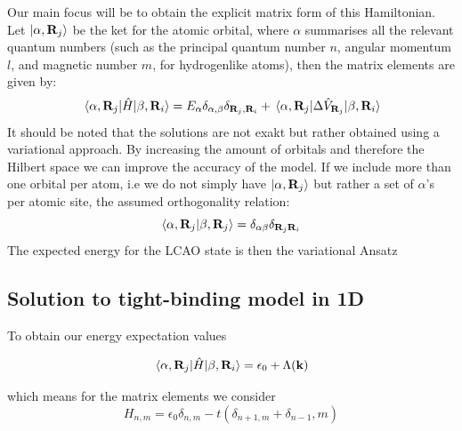 \documentclass[11pt, a4paper]{article}
\theoremstyle{definition} %
\begin{document}
Our main focus will be to obtain the explicit matrix form of this Hamiltonian. Let $\ket{\alpha, \mathbf{R}_j}$ be the ket for the atomic orbital, where $\alpha$ summarises all the relevant quantum numbers (such as the principal quantum number $n$, angular momentum $l$, and magnetic number $m$, for hydrogenlike atoms), then the matrix elements are given by:
\begin{equation}
	\mel{\alpha, \mathbf{R}_j}{\hat{H}}{\beta, \mathbf{R}_i} = E_{\alpha} \delta_{\alpha,\beta} \delta_{\mathbf{R}_j, \mathbf{R}_i} + \mel{\alpha,\mathbf{R}_j}{\Delta \hat{V}_{\mathbf{R}_j}}{\beta, \mathbf{R}_i}
\end{equation}
It should be noted that the solutions are not exakt but rather obtained using a variational approach. By increasing the amount of orbitals and therefore the Hilbert space we can improve the accuracy of the model. If we include more than one orbital per atom, i.e we do not simply have $\ket{\alpha,\mathbf{R}_j}$ but rather a set of $\alpha$'s per atomic site, the assumed orthogonality relation:
\begin{equation}
	\braket{\alpha, \mathbf{R}_j}{\beta, \mathbf{R}_j} = \delta_{\alpha\beta} \delta_{\mathbf{R}_j\mathbf{R}_i}
\end{equation}
The expected energy for the LCAO state is then the variational Ansatz \cite{Manfred}
\subsection{Solution to tight-binding model in 1D}
To obtain our energy expectation values

\begin{equation}
	\mel{\alpha, \mathbf{R}_j}{\hat{H}}{\beta, \mathbf{R}_i} =  \epsilon_0 + \Lambda(\mathbf{k})
\end{equation}


which means for the matrix elements we consider
\begin{equation}
	H_{n,m} = \epsilon_0 \delta_{n,m} - t(\delta_{n+1, m} + \delta_{n-1},m)
\end{equation}

\end{document}
